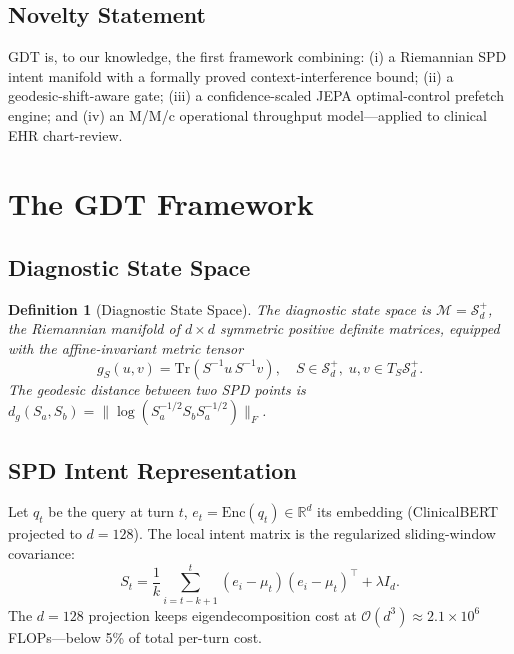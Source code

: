 \documentclass[11pt,a4paper]{article}
\newtheorem{definition}{Definition}
\begin{document}
\subsection{Novelty Statement}
GDT is, to our knowledge, the first framework combining: (i) a Riemannian SPD intent manifold with a formally proved context-interference bound; (ii) a geodesic-shift-aware gate; (iii) a confidence-scaled JEPA optimal-control prefetch engine; and (iv) an M/M/c operational throughput model---applied to clinical EHR chart-review.

\section{The GDT Framework}
\label{sec:framework}

\subsection{Diagnostic State Space}

\begin{definition}[Diagnostic State Space]
\label{def:state_space}
The \emph{diagnostic state space} is $\mathcal{M} = \mathcal{S}_d^+$, the Riemannian manifold of $d{\times}d$ symmetric positive definite matrices, equipped with the affine-invariant metric tensor
\begin{equation}
  g_S(u, v) = \mathrm{Tr}(S^{-1} u\, S^{-1} v),
  \quad S \in \mathcal{S}_d^+,\; u,v \in T_S\mathcal{S}_d^+.
  \label{eq:metric_tensor}
\end{equation}
The geodesic distance between two SPD points is
$d_g(S_a, S_b) = \|\log(S_a^{-1/2} S_b S_a^{-1/2})\|_F$.
\end{definition}

\subsection{SPD Intent Representation}

Let $q_t$ be the query at turn $t$, $e_t = \mathrm{Enc}(q_t) \in \mathbb{R}^d$ its embedding (ClinicalBERT projected to $d{=}128$). The local intent matrix is the regularized sliding-window covariance:
\begin{equation}
  S_t = \frac{1}{k}\sum_{i=t-k+1}^{t}(e_i-\mu_t)(e_i-\mu_t)^{\top} + \lambda I_d.
  \label{eq:spdintent}
\end{equation}
The $d{=}128$ projection keeps eigendecomposition cost at $\mathcal{O}(d^3){\approx}2.1{\times}10^6$ FLOPs---below 5\% of total per-turn cost.
\end{document}
